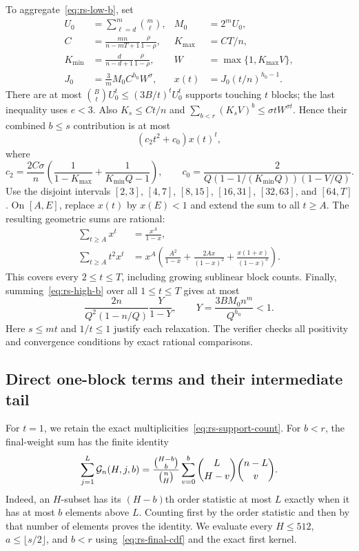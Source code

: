 To aggregate~\eqref{eq:rs-low-b}, set
\[
\begin{aligned}
 U_0&=\sum_{\ell=d}^m\binom m\ell,& M_0&=2^mU_0,\\
 C&=\frac{mn}{n-mT+1}\frac\rho{1-\rho},&
 K_{\max}&=CT/n,\\
 K_{\min}&=\frac d{n-d+1}\frac\rho{1-\rho},&
 W&=\max\{1,K_{\max}V\},\\
 J_0&=\frac3m M_0 C^{h_0}W^\sigma,&
 x(t)&=J_0(t/n)^{h_0-1}.
\end{aligned}
\]
There are at most $\binom BtU_0^t\le(3B/t)^tU_0^t$ supports touching
$t$ blocks; the last inequality uses $e<3$.  Also $K_s\le Ct/n$ and
$\sum_{b<r}(K_sV)^b\le\sigma tW^{\sigma t}$.  Hence their combined
$b\le s$ contribution is at most
\begin{equation}
 (c_2t^2+c_0)x(t)^t,
 \label{eq:rs-t-envelope}
\end{equation}
where
\[
 c_2=\frac{2C\sigma}{n}
   \left(\frac1{1-K_{\max}}+\frac1{K_{\min}Q-1}\right),\qquad
 c_0=\frac2{Q(1-1/(K_{\min}Q))(1-V/Q)}.
\]
Use the disjoint intervals $[2,3]$, $[4,7]$, $[8,15]$, $[16,31]$,
$[32,63]$, and $[64,T]$.  On $[A,E]$, replace $x(t)$ by $x(E)<1$ and
extend the sum to all $t\ge A$.  The resulting geometric sums are rational:
\[
\begin{aligned}
 \sum_{t\ge A}x^t&=\frac{x^A}{1-x},\\
 \sum_{t\ge A}t^2x^t
 &=x^A\left(\frac{A^2}{1-x}
      +\frac{2Ax}{(1-x)^2}+\frac{x(1+x)}{(1-x)^3}\right).
\end{aligned}
\]
This covers every $2\le t\le T$, including growing sublinear block counts.
Finally, summing~\eqref{eq:rs-high-b} over all $1\le t\le T$ gives at most
\begin{equation}
 \frac{2n}{Q^2(1-n/Q)}\frac Y{1-Y},\qquad
 Y=\frac{3BM_0n^m}{Q^{h_0}}<1.
 \label{eq:rs-global-high-b}
\end{equation}
Here $s\le mt$ and $1/t\le1$ justify each relaxation.  The verifier checks
all positivity and convergence conditions by exact rational comparisons.

\subsection{Direct one-block terms and their intermediate tail}

For $t=1$, we retain the exact multiplicities~\eqref{eq:rs-support-count}.
For $b<r$, the final-weight sum has the finite identity
\begin{equation}
 \sum_{j=1}^L\mathcal G_n(H,j,b)
 =\frac{\binom{H-b}b}{\binom nH}
   \sum_{v=0}^b\binom L{H-v}\binom{n-L}v.
 \label{eq:rs-final-cdf}
\end{equation}
Indeed, an $H$-subset has its $(H-b)$th order statistic at most $L$
exactly when it has at most $b$ elements above $L$.  Counting first by the
order statistic and then by that number of elements proves the identity.
We evaluate every $H\le512$, $a\le\lfloor s/2\rfloor$, and $b<r$
using~\eqref{eq:rs-final-cdf} and the exact first kernel.

